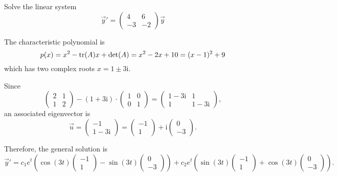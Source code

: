 \begin{example}
  Solve the linear system
  \[
  \vec{y}'=\begin{pmatrix}
    4 & 6\\
    -3 & -2
  \end{pmatrix}\vec{y}  
  \]
\end{example}
\begin{solution}
  The characteristic polynomial is
  \[
  p(x)=x^2-\operatorname{tr}(A)x+\det(A)=x^2-2x+10=(x-1)^2+9  
  \]
  which has two complex roots $x=1\pm 3\mathrm{i}$.
  
  Since
  \[
    \begin{pmatrix}
      2 & 1\\
      1 & 2
    \end{pmatrix}- (1+3\mathrm{i})\cdot 
  \begin{pmatrix}
    1 & 0\\
    0 & 1
  \end{pmatrix}  
  =
  \begin{pmatrix}
    1-3\mathrm{i} & 1\\
    1 & 1-3\mathrm{i}
  \end{pmatrix},
  \]
  an associated eigenvector is
  \[
  \vec{u}=
  \begin{pmatrix}
    -1 \\ 1-3\mathrm{i}
  \end{pmatrix}=
  \begin{pmatrix}
    -1 \\ 1
  \end{pmatrix}
  +\mathrm{i}\begin{pmatrix}
    0 \\ -3
  \end{pmatrix}
  .  
  \]

Therefore, the general solution is
\[
\vec{y}'=c_1e^t\left(
\cos(3t)
\begin{pmatrix}
  -1 \\ 1
\end{pmatrix} -\sin(3t)
\begin{pmatrix}
  0 \\ -3
\end{pmatrix}
\right) + c_2 e^{t}\left(
  \sin(3t)
  \begin{pmatrix}
    -1 \\ 1
  \end{pmatrix}
+\cos(3t)
\begin{pmatrix}
  0 \\ -3
\end{pmatrix}
\right).
\]
\end{solution}

